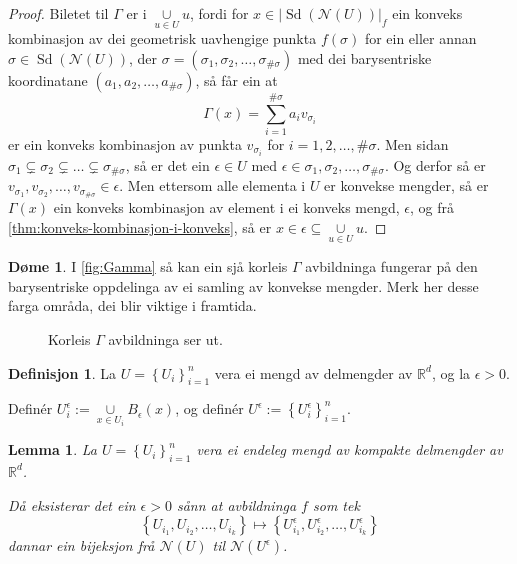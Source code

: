 \documentclass[a4paper, 12pt, norsk]{article}
\theoremstyle{plain}
\newtheorem{lemma}[theorem]{Lemma}
\theoremstyle{definition}
\newtheorem{definition}[theorem]{Definisjon}
\newtheorem{example}[theorem]{Døme}
\newcommand{\Rb}{\mathbb{R}}
\newcommand{\Nc}{\mathcal{N}}
\newcommand{\union}{ \mathop{\cup}\limits }
\newcommand{\gr}[1]{ \lvert #1 \rvert } %
\newcommand{\set}[1]{ \left\{ #1 \right\} } %
\newcommand{\tuple}[1]{ \left( #1 \right) } %
\DeclareMathOperator{\Sd}{Sd} %
\begin{document}
\begin{proof}
	Biletet til \( \Gamma \) er i \( \union_{u\in U} u \), fordi for \( x \in \gr{\Sd(\Nc(U))}_f \) ein konveks kombinasjon av dei geometrisk uavhengige punkta \( f(\sigma) \) for ein eller annan \( \sigma \in \Sd(\Nc(U)) \), der \( \sigma = \tuple{\sigma_1, \sigma_2, \dots, \sigma_{\#\sigma}} \) med dei barysentriske koordinatane \( \tuple{a_1, a_2, \dots, a_{\#\sigma}} \), så får ein at
	\[
		\Gamma(x) = \sum_{i=1}^{\#\sigma} a_i v_{\sigma_i}
	\]
	er ein konveks kombinasjon av punkta \( v_{\sigma_i} \) for \( i = 1,2,\dots,\#\sigma \). Men sidan \( \sigma_1 \subsetneq \sigma_2 \subsetneq \dots \subsetneq \sigma_{\#\sigma} \), så er det ein \( \epsilon \in U \) med \( \epsilon \in \sigma_1, \sigma_2, \dots, \sigma_{\#\sigma} \). Og derfor så er \( v_{\sigma_1}, v_{\sigma_2}, \dots, v_{\sigma_{\#\sigma}} \in \epsilon \). Men ettersom alle elementa i \( U \) er konvekse mengder, så er \( \Gamma(x) \) ein konveks kombinasjon av element i ei konveks mengd, \( \epsilon \), og frå \autoref{thm:konveks-kombinasjon-i-konveks}, så er \( x \in \epsilon \subseteq \union_{u\in U} u \).
\end{proof}

\begin{example}
	I \autoref{fig:Gamma} så kan ein sjå korleis \( \Gamma \) avbildninga fungerar på den barysentriske oppdelinga av ei samling av konvekse mengder. Merk her desse farga områda, dei blir viktige i framtida.
	\begin{figure}[htbp]
		\begin{center}
			
		\end{center}
		\caption{Korleis \( \Gamma \) avbildninga ser ut.}
		\label{fig:Gamma}
	\end{figure}
\end{example}

\begin{definition}
	La \(  U=\set{U_i}_{i=1}^n \) vera ei mengd av delmengder av \( \Rb^d \), og la \( \epsilon > 0 \).
	
	Definér \( U_i^\epsilon := \union_{x \in U_i} B_\epsilon(x) \), og definér \( U^\epsilon := \set{U_i^\epsilon}_{i=1}^n \).
\end{definition}

\begin{lemma} \label{thm:epsilondekke}
	La \( U = \set{U_i}_{i=1}^n \) vera ei endeleg mengd av kompakte delmengder av \( \Rb^d \). 
	
	Då eksisterar det ein \( \epsilon > 0 \) sånn at avbildninga \( f \) som tek 
	\[ 
		\set{U_{i_1}, U_{i_2}, \dots, U_{i_k}} \mapsto \set{U_{i_1}^\epsilon, U_{i_2}^\epsilon, \dots, U_{i_k}^\epsilon} 
	\] 
	dannar ein bijeksjon frå  \(\Nc(U) \) til \( \Nc(U^\epsilon) \).
\end{lemma}
\end{document}

